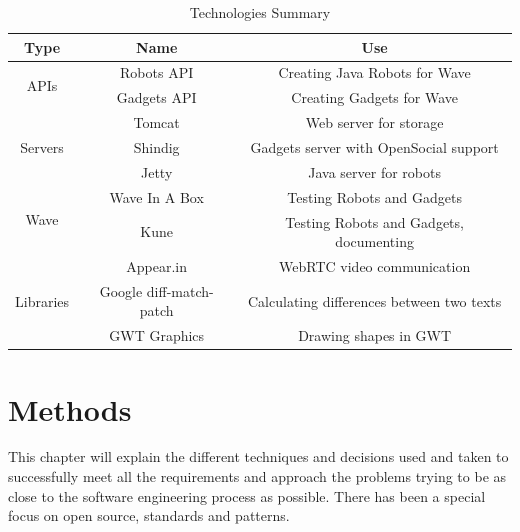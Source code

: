 \begin{table}[h]
  \footnotesize
  \begin{center}
    \begin{tabular}{ | c | c | c |}
      \hline
      \textbf{Type} & \textbf{Name} & \textbf{Use}\\
      \hline
      \multirow{2}{*}{APIs}
        & Robots API & Creating Java Robots for Wave \\ \cline{2-3}
        & Gadgets API & Creating Gadgets for Wave \\
      \hline
      \multirow{3}{*}{Servers}
        & Tomcat & Web server for storage \\ \cline{2-3}
        & Shindig & Gadgets server with OpenSocial support \\ \cline{2-3}
        & Jetty & Java server for robots \\
      \hline
      \multirow{2}{*}{Wave}
        & Wave In A Box & Testing Robots and Gadgets \\ \cline{2-3}
        & Kune & Testing Robots and Gadgets, documenting \\ \cline{2-3}
      \hline
      \multirow{3}{*}{Libraries}
        & Appear.in & WebRTC video communication \\ \cline{2-3}
        & Google diff-match-patch & Calculating differences between two texts \\ \cline{2-3}
        & GWT Graphics & Drawing shapes in GWT \\
      \hline
    \end{tabular}
  \end{center}
  \caption{Technologies Summary}
  \label{fig:technologies}
\end{table}

\section{Methods}
This chapter will explain the different techniques and decisions used and taken to successfully meet all the requirements and approach the problems trying to be as close to the software engineering process as possible. There has been a special focus on open source, standards and patterns.
